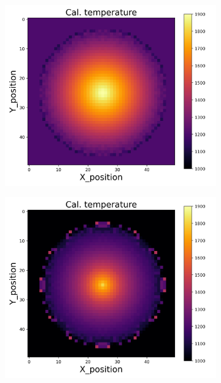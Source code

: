 {\begin{figure}[p]
\begin{minipage}{\textwidth}
\begin{subfigure}{0.325\textwidth}
        \end{subfigure}
        \begin{subfigure}{0.325\textwidth}
            \centering
            \includegraphics[width=\textwidth]{figures/raw_data/26/lin_square/T_cal.jpg}
        \end{subfigure}
        \begin{subfigure}{0.325\textwidth}
            \centering
            \includegraphics[width=\textwidth]{figures/raw_data/31/lin_square/T_cal.jpg}

\end{subfigure}
\end{minipage}
\end{figure}}
